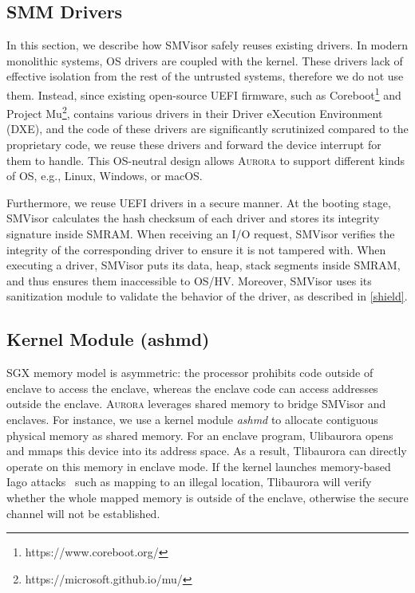 \subsection{SMM Drivers}\label{driver}
In this section, we describe how SMVisor safely reuses existing drivers. In modern monolithic systems, OS drivers are coupled with the kernel. These drivers lack of effective isolation from the rest of the untrusted systems, therefore we do not use them. Instead, since existing open-source UEFI firmware, such as Coreboot\footnote{https://www.coreboot.org/} and Project Mu\footnote{https://microsoft.github.io/mu/}, contains various drivers in their Driver eXecution Environment (DXE), and the code of these drivers are significantly scrutinized compared to the proprietary code, we reuse these drivers and forward the device interrupt for them to handle. This OS-neutral design allows \textsc{Aurora} to support different kinds of OS, e.g., Linux, Windows, or macOS.

Furthermore, we reuse UEFI drivers in a secure manner. At the booting stage, SMVisor calculates the hash checksum of each driver and stores its integrity signature inside SMRAM. When receiving an I/O request, SMVisor verifies the integrity of the corresponding driver to ensure it is not tampered with. When executing a driver, SMVisor puts its data, heap, stack segments inside SMRAM, and thus ensures them inaccessible to OS/HV. Moreover, SMVisor uses its sanitization module to validate the behavior of the driver, as described in \autoref{shield}.

\subsection{Kernel Module (ashmd)}
SGX memory model is asymmetric: the processor prohibits code outside of enclave to access the enclave, whereas the enclave code can access addresses outside the enclave. \textsc{Aurora} leverages shared memory to bridge SMVisor and enclaves. For instance, we use a kernel module \emph{ashmd} to allocate contiguous physical memory as shared memory. For an enclave program, Ulibaurora opens and mmaps this device into its  address space. As a result, Tlibaurora can directly operate on this memory in enclave mode. If the kernel launches memory-based Iago attacks~\cite{DBLP:conf/asplos/CheckowayS13} such as mapping to an illegal location, Tlibaurora will verify whether the whole mapped memory is outside of the enclave, otherwise the secure channel will not be established. 

